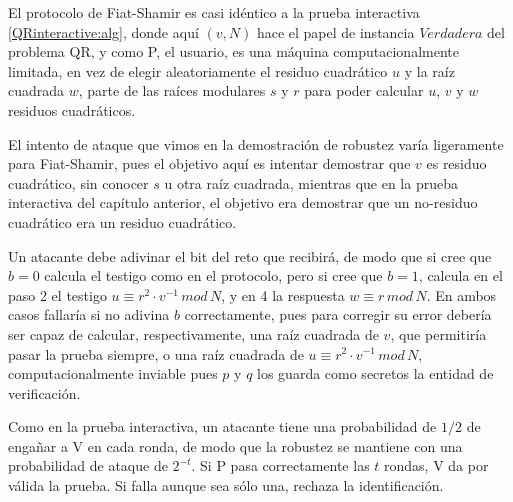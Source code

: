 \hfil


El protocolo de Fiat-Shamir es casi idéntico a la prueba interactiva \ref{QRinteractive:alg}, donde aquí $(v,N)$ hace el papel de instancia $Verdadera$ del problema QR, y como P, el usuario, es una máquina computacionalmente limitada, en vez de elegir aleatoriamente el residuo cuadrático $u$ y la raíz cuadrada $w$, parte de las raíces modulares $s$ y $r$ para poder calcular $u$, $v$ y $w$ residuos cuadráticos.


El intento de ataque que vimos en la demostración de robustez varía ligeramente para Fiat-Shamir, pues el objetivo aquí es intentar demostrar que $v$ es residuo cuadrático, sin conocer $s$ u otra raíz cuadrada, mientras que en la prueba interactiva del capítulo anterior, el objetivo era demostrar que un no-residuo cuadrático era un residuo cuadrático.

Un atacante debe adivinar el bit del reto que recibirá, de modo que si cree que $b=0$ calcula el testigo como en el protocolo, pero si cree que $b=1$, calcula en el paso 2 el testigo $u \equiv r^2\cdot v^{-1} \, mod \, N$, y en 4 la respuesta $w \equiv r \, mod \, N$. En ambos casos fallaría si no adivina $b$ correctamente, pues para corregir su error debería ser capaz de calcular, respectivamente, una raíz cuadrada de $v$, que permitiría pasar la prueba siempre, o una raíz cuadrada de $u \equiv r^2\cdot v^{-1} \, mod \, N$, computacionalmente inviable pues $p$ y $q$ los guarda como secretos la entidad de verificación.

Como en la prueba interactiva, un atacante tiene una probabilidad de $1/2$ de engañar a V en cada ronda, de modo que la robustez se mantiene con una probabilidad de ataque de $2^{-t}$. Si P pasa correctamente las $t$ rondas, V da por válida la prueba. Si falla aunque sea sólo una, rechaza la identificación.




